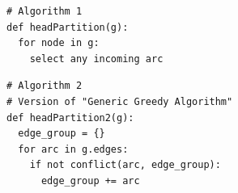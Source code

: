 \documentclass[12pt, letter]{article}
\begin{document}
\begin{verbatim}
# Algorithm 1
def headPartition(g):
  for node in g:
    select any incoming arc
\end{verbatim}

\begin{verbatim}
# Algorithm 2
# Version of "Generic Greedy Algorithm"
def headPartition2(g):
  edge_group = {}
  for arc in g.edges:
    if not conflict(arc, edge_group):
      edge_group += arc
\end{verbatim}
\end{document}
